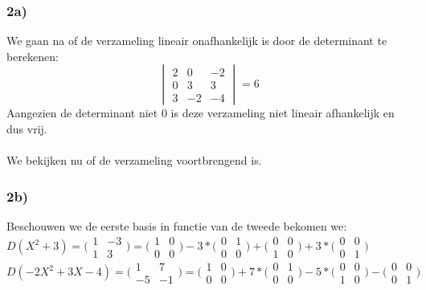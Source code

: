 \documentclass[lineaire_algebra_oplossingen.tex]{subfiles}
\begin{document}
\subsubsection*{2a)}
We gaan na of de verzameling lineair onafhankelijk is door de determinant te berekenen:
$$
\begin{vmatrix}
2 & 0 & -2\\
0&3&3\\
3&-2&-4
\end{vmatrix}
= 6
$$
Aangezien de determinant niet 0 is deze verzameling niet lineair afhankelijk en dus vrij.
\\
\\
We bekijken nu of de verzameling voortbrengend is.
\subsubsection*{2b)}

Beschouwen we de eerste basis in functie van de tweede bekomen we:\\

$D(X^2+3) = \bigl(
\begin{smallmatrix}
1&-3\\ 1&3
\end{smallmatrix}
\bigr) = \bigl(
\begin{smallmatrix}
1&0\\ 0&0
\end{smallmatrix}
\bigr) -3* \bigl(
\begin{smallmatrix}
0&1\\ 0&0
\end{smallmatrix}
\bigr) + \bigl(
\begin{smallmatrix}
0&0\\ 1&0
\end{smallmatrix}
\bigr) +3* \bigl(
\begin{smallmatrix}
0&0\\ 0&1
\end{smallmatrix}
\bigr)$\\

$D(-2X^2+3X-4) = \bigl(
\begin{smallmatrix}
1&7\\ -5&-1
\end{smallmatrix}
\bigr) = \bigl(
\begin{smallmatrix}
1&0\\ 0&0
\end{smallmatrix}
\bigr) + 7* \bigl(
\begin{smallmatrix}
0&1\\ 0&0
\end{smallmatrix}
\bigr) - 5* \bigl(
\begin{smallmatrix}
0&0\\ 1&0
\end{smallmatrix}
\bigr) - \bigl(
\begin{smallmatrix}
0&0\\ 0&1
\end{smallmatrix}
\bigr)$\\
\end{document}
